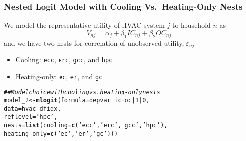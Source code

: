\documentclass{beamer}\usepackage[]{graphicx}\usepackage[]{xcolor}
\makeatletter
\newcommand{\hlnum}[1]{\textcolor[rgb]{0.686,0.059,0.569}{#1}}%
\newcommand{\hlstr}[1]{\textcolor[rgb]{0.192,0.494,0.8}{#1}}%
\newcommand{\hlcom}[1]{\textcolor[rgb]{0.678,0.584,0.686}{\textit{#1}}}%
\newcommand{\hlopt}[1]{\textcolor[rgb]{0,0,0}{#1}}%
\newcommand{\hlstd}[1]{\textcolor[rgb]{0.345,0.345,0.345}{#1}}%
\newcommand{\hlkwb}[1]{\textcolor[rgb]{0.69,0.353,0.396}{#1}}%
\newcommand{\hlkwc}[1]{\textcolor[rgb]{0.333,0.667,0.333}{#1}}%
\newcommand{\hlkwd}[1]{\textcolor[rgb]{0.737,0.353,0.396}{\textbf{#1}}}%
\newenvironment{kframe}{%
 \def\at@end@of@kframe{}%
 \ifinner\ifhmode%
  \def\at@end@of@kframe{\end{minipage}}%
  \begin{minipage}{\columnwidth}%
 \fi\fi%
 \def\FrameCommand##1{\hskip\@totalleftmargin \hskip-\fboxsep
 \colorbox{shadecolor}{##1}\hskip-\fboxsep
     \hskip-\linewidth \hskip-\@totalleftmargin \hskip\columnwidth}%
 \MakeFramed {\advance\hsize-\width
   \@totalleftmargin\z@ \linewidth\hsize
   \@setminipage}}%
 {\par\unskip\endMakeFramed%
 \at@end@of@kframe}
\newenvironment{knitrout}{}{} %
\makeatother
\begin{document}
\begin{frame}[fragile]\frametitle{Nested Logit Model with Cooling Vs.\ Heating-Only Nests}
    We model the representative utility of HVAC system $j$ to household $n$ as
    $$V_{nj} = \alpha_j + \beta_1 IC_{nj} + \beta_2 OC_{nj}$$
    and we have two nests for correlation of unobserved utility, $\varepsilon_{nj}$
    \begin{itemize}
    	\item Cooling: \texttt{ecc}, \texttt{erc}, \texttt{gcc}, and \texttt{hpc}
    	\item Heating-only: \texttt{ec}, \texttt{er}, and \texttt{gc}
    \end{itemize}
\begin{knitrout}\footnotesize
{}\color{fgcolor}\begin{kframe}
\begin{alltt}
\hlcom{## Model choice with cooling vs. heating-only nests}
\hlstd{model_2} \hlkwb{<-} \hlkwd{mlogit}\hlstd{(}\hlkwc{formula} \hlstd{= depvar} \hlopt{~} \hlstd{ic} \hlopt{+} \hlstd{oc} \hlopt{|} \hlnum{1} \hlopt{|} \hlnum{0}\hlstd{,}
                  \hlkwc{data} \hlstd{= hvac_dfidx,}
                  \hlkwc{reflevel} \hlstd{=} \hlstr{'hpc'}\hlstd{,}
                  \hlkwc{nests} \hlstd{=} \hlkwd{list}\hlstd{(}\hlkwc{cooling} \hlstd{=} \hlkwd{c}\hlstd{(}\hlstr{'ecc'}\hlstd{,} \hlstr{'erc'}\hlstd{,} \hlstr{'gcc'}\hlstd{,} \hlstr{'hpc'}\hlstd{),}
                               \hlkwc{heating_only} \hlstd{=} \hlkwd{c}\hlstd{(}\hlstr{'ec'}\hlstd{,} \hlstr{'er'}\hlstd{,} \hlstr{'gc'}\hlstd{)))}
\end{alltt}
\end{kframe}
\end{knitrout}
\end{frame}
\end{document}
